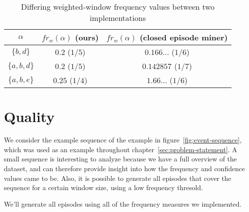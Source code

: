\begin{table}
\centering

\begin{tabulary}{\textwidth}{ C|C|C }

$ \alpha $ & $ fr_w(\alpha) $ (ours) & $ fr_w(\alpha) $ (closed episode miner) \\
\hline
$ \{ b, d \} $ & $ 0.2 $ ($ 1/5 $) & $ 0.166 \ldots $ ($ 1/6 $) \\
$ \{ a, b, d \} $ & $ 0.2 $ ($ 1/5 $) & $ 0.142857 $ ($ 1/7 $) \\
$ \{ a, b, e \} $ & $ 0.25 $ ($ 1/4 $) & $ 1.66 \ldots $ ($ 1/6 $) \\

\end{tabulary}

\caption{Differing weighted-window frequency values between two implementations}
\label{table:closepi-frequency-difference}
\end{table}

\section{Quality}

We consider the example sequence of the example in figure~\ref{fig:event-sequence}, which was used as an example throughout chapter~\ref{sec:problem-statement}. A small sequence is interesting to analyze because we have a full overview of the dataset, and can therefore provide insight into how the frequency and confidence values came to be. Also, it is possible to generate all episodes that cover the sequence for a certain window size, using a low frequency thresold.

We'll generate all episodes using all of the frequency measures we implemented.

